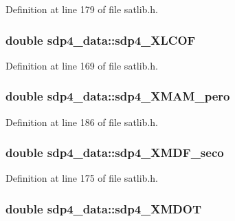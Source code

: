 Definition at line 179 of file satlib.\-h.

\hypertarget{structsdp4__data_a6262addda0a9c7c6f18e228fe56928d1}{
\subsubsection[{sdp4\-\_\-\-X\-L\-C\-O\-F}]{\setlength{\rightskip}{0pt plus 5cm}double sdp4\-\_\-data\-::sdp4\-\_\-\-X\-L\-C\-O\-F}}\label{structsdp4__data_a6262addda0a9c7c6f18e228fe56928d1}


Definition at line 169 of file satlib.\-h.

\hypertarget{structsdp4__data_a4db782ac5e3b58c51f2aeb4af4793de8}{
\subsubsection[{sdp4\-\_\-\-X\-M\-A\-M\-\_\-pero}]{\setlength{\rightskip}{0pt plus 5cm}double sdp4\-\_\-data\-::sdp4\-\_\-\-X\-M\-A\-M\-\_\-pero}}\label{structsdp4__data_a4db782ac5e3b58c51f2aeb4af4793de8}


Definition at line 186 of file satlib.\-h.

\hypertarget{structsdp4__data_a5c90a848d6bdf6beb3a766d77e0e250c}{
\subsubsection[{sdp4\-\_\-\-X\-M\-D\-F\-\_\-seco}]{\setlength{\rightskip}{0pt plus 5cm}double sdp4\-\_\-data\-::sdp4\-\_\-\-X\-M\-D\-F\-\_\-seco}}\label{structsdp4__data_a5c90a848d6bdf6beb3a766d77e0e250c}


Definition at line 175 of file satlib.\-h.

\hypertarget{structsdp4__data_a6506c7b244edd99ce4592fdc285e22a5}{
\subsubsection[{sdp4\-\_\-\-X\-M\-D\-O\-T}]{\setlength{\rightskip}{0pt plus 5cm}double sdp4\-\_\-data\-::sdp4\-\_\-\-X\-M\-D\-O\-T}}\label{structsdp4__data_a6506c7b244edd99ce4592fdc285e22a5}


